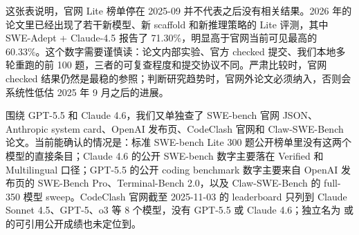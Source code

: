 \documentclass[UTF8,a4paper,11pt]{ctexart}
\begin{document}
这张表说明，官网 Lite 榜单停在 2025-09 并不代表之后没有相关结果。2026 年的论文里已经出现了若干新模型、新 scaffold 和新推理策略的 Lite 评测，其中 SWE-Adept + Claude-4.5 报告了 71.30\%，明显高于官网当前可见最高的 60.33\%。这个数字需要谨慎读：论文内部实验、官方 checked 提交、我们本地多轮重跑的前 100 题，三者的可复查程度和提交协议不同。严肃比较时，官网 checked 结果仍然是最稳的参照；判断研究趋势时，官网外论文必须纳入，否则会系统性低估 2025 年 9 月之后的进展。

围绕 GPT-5.5 和 Claude 4.6，我们又单独查了 SWE-bench 官网 JSON、Anthropic system card、OpenAI 发布页、CodeClash 官网和 Claw-SWE-Bench 论文。当前能确认的情况是：标准 SWE-bench Lite 300 题公开榜单里没有这两个模型的直接条目；Claude 4.6 的公开 SWE-bench 数字主要落在 Verified 和 Multilingual 口径；GPT-5.5 的公开 coding benchmark 数字主要来自 OpenAI 发布页的 SWE-Bench Pro、Terminal-Bench 2.0，以及 Claw-SWE-Bench 的 full-350 模型 sweep。CodeClash 官网截至 2025-11-03 的 leaderboard 只列到 Claude Sonnet 4.5、GPT-5、o3 等 8 个模型，没有 GPT-5.5 或 Claude 4.6；独立名为  或  的可引用公开成绩也未定位到。
\end{document}
